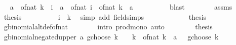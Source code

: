 \begin{isabellebody}
\ \isamarkupfalse%
\ {\isachardoublequoteopen}a\ {\isacharasterisk}{\kern0pt}\ of{\isacharunderscore}{\kern0pt}nat\ {\isacharparenleft}{\kern0pt}k\ {\isacharminus}{\kern0pt}\ i{\isacharparenright}{\kern0pt}\ {\isasymle}\ {\isacharparenleft}{\kern0pt}a\ {\isacharminus}{\kern0pt}\ of{\isacharunderscore}{\kern0pt}nat\ i{\isacharparenright}{\kern0pt}\ {\isacharasterisk}{\kern0pt}\ {\isacharparenleft}{\kern0pt}of{\isacharunderscore}{\kern0pt}nat\ k\ {\isacharcolon}{\kern0pt}{\isacharcolon}{\kern0pt}\ {\isacharprime}{\kern0pt}a{\isacharparenright}{\kern0pt}{\isachardoublequoteclose}\isanewline
\ \ \ \ \ \ \ \ \isamarkupfalse%
\ blast\isanewline
\ \ \ \ \ \ \isamarkupfalse%
\ assms\ \isamarkupfalse%
\ {\isacharquery}{\kern0pt}thesis\isanewline
\ \ \ \ \ \ \ \ \isamarkupfalse%
\ {\isacartoucheopen}i\ {\isacharless}{\kern0pt}\ k{\isacartoucheclose}\ \isamarkupfalse%
\ {\isacharparenleft}{\kern0pt}simp\ add{\isacharcolon}{\kern0pt}\ field{\isacharunderscore}{\kern0pt}simps{\isacharparenright}{\kern0pt}\isanewline
\ \ \ \ \isamarkupfalse%
\isanewline
\ \ \ \ \isamarkupfalse%
\ \isamarkupfalse%
\ {\isacharquery}{\kern0pt}thesis\isanewline
\ \ \ \ \ \ \isamarkupfalse%
\ gbinomial{\isacharunderscore}{\kern0pt}altdef{\isacharunderscore}{\kern0pt}of{\isacharunderscore}{\kern0pt}nat\isanewline
\ \ \ \ \ \ \isamarkupfalse%
\ {\isacharparenleft}{\kern0pt}intro\ prod{\isacharunderscore}{\kern0pt}mono{\isacharparenright}{\kern0pt}\ auto\isanewline
\ \ \isamarkupfalse%
\isanewline
\ \ \isamarkupfalse%
\ \isamarkupfalse%
\ {\isacharquery}{\kern0pt}thesis\ \isacommand{{\isachardot}{\kern0pt}}\isamarkupfalse%
\isanewline
{}\isamarkupfalse%
%
\endisatagproof
{\isafoldproof}%
%
\isadelimproof
\isanewline
%
\endisadelimproof
\isanewline
{}\isamarkupfalse%
\ gbinomial{\isacharunderscore}{\kern0pt}negated{\isacharunderscore}{\kern0pt}upper{\isacharcolon}{\kern0pt}\ {\isachardoublequoteopen}{\isacharparenleft}{\kern0pt}a\ gchoose\ k{\isacharparenright}{\kern0pt}\ {\isacharequal}{\kern0pt}\ {\isacharparenleft}{\kern0pt}{\isacharminus}{\kern0pt}{}{\isacharparenright}{\kern0pt}\ {\isacharcircum}{\kern0pt}\ k\ {\isacharasterisk}{\kern0pt}\ {\isacharparenleft}{\kern0pt}{\isacharparenleft}{\kern0pt}of{\isacharunderscore}{\kern0pt}nat\ k\ {\isacharminus}{\kern0pt}\ a\ {\isacharminus}{\kern0pt}\ {}{\isacharparenright}{\kern0pt}\ gchoose\ k{\isacharparenright}{\kern0pt}{\isachardoublequoteclose}\isanewline

\end{isabellebody}

